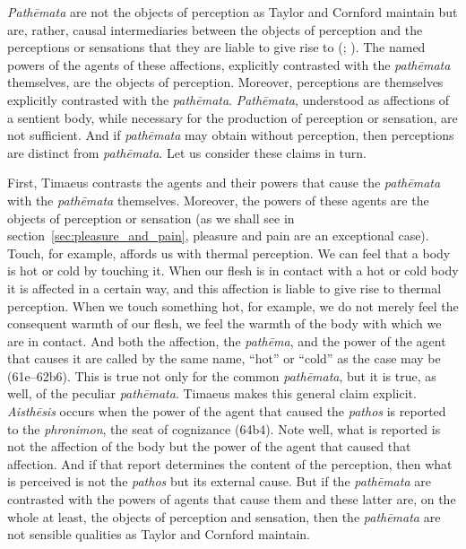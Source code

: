 \emph{Pathēmata} are not the objects of perception as Taylor and Cornford maintain but are, rather, causal intermediaries between the objects of perception and the perceptions or sensations that they are liable to give rise to (\citealt[138]{OBrien:1984ji}; \citealt{Brisson:1997qr}). The named powers of the agents of these affections, explicitly contrasted with the \emph{pathēmata} themselves, are the objects of perception. Moreover, perceptions are themselves explicitly contrasted with the \emph{pathēmata}. \emph{Pathēmata}, understood as affections of a sentient body, while necessary for the production of perception or sensation, are not sufficient. And if \emph{pathēmata} may obtain without perception, then perceptions are distinct from \emph{pathēmata}. Let us consider these claims in turn.

First, Timaeus contrasts the agents and their powers that cause the \emph{pathēmata} with the \emph{pathēmata} themselves. Moreover, the powers of these agents are the objects of perception or sensation (as we shall see in section~\ref{sec:pleasure_and_pain}, pleasure and pain are an exceptional case). Touch, for example, affords us with thermal perception. We can feel that a body is hot or cold by touching it. When our flesh is in contact with a hot or cold body it is affected in a certain way, and this affection is liable to give rise to thermal perception. When we touch something hot, for example, we do not merely feel the consequent warmth of our flesh, we feel the warmth of the body with which we are in contact. And both the affection, the \emph{pathēma}, and the power of the agent that causes it are called by the same name, ``hot'' or ``cold'' as the case may be (61e--62b6). This is true not only for the common \emph{pathēmata}, but it is true, as well, of the peculiar \emph{pathēmata}. Timaeus makes this general claim explicit. \emph{Aisthēsis} occurs when the power of the agent that caused the \emph{pathos} is reported to the \emph{phronimon}, the seat of cognizance (64b4). Note well, what is reported is not the affection of the body but the power of the agent that caused that affection. And if that report determines the content of the perception, then what is perceived is not the \emph{pathos} but its external cause. But if the \emph{pathēmata} are contrasted with the powers of agents that cause them and these latter are, on the whole at least, the objects of perception and sensation, then the \emph{pathēmata} are not sensible qualities as Taylor and Cornford maintain.

